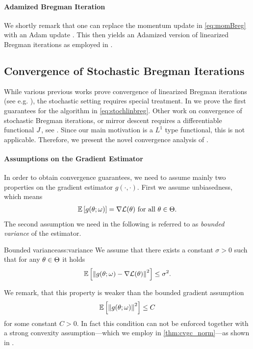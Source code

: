 \paragraph{Adamized Bregman Iteration} We shortly remark that one can replace the momentum update in \cref{eq:momBreg} with an Adam update \cite{kingma2014adam}. This then yields an Adamized version of linearized Bregman iterations as employed in \cite{bungert2022bregman}.


\subsection{Convergence of Stochastic Bregman Iterations}\label{sec:ConvAna}
%
%
While various previous works prove convergence of linearized Bregman iterations (see e.g. \cite{osher2005iterative, cai2009convergence}), the stochastic setting requires special treatment. In \cite{bungert2022bregman} we prove the first guarantees for the algorithm in \cref{eq:stochlinbreg}. Other work on convergence of stochastic Bregman iterations, or mirror descent requires a differentiable functional $J$, see \cite{dragomir2021fast, hanzely2021fastest, zhang2018convergence, d2021stochastic, aubin2022mirror}. Since our main motivation is a $L^1$ type functional, this is not applicable. Therefore, we present the novel convergence analysis of \cite{bungert2022bregman}.
%
%
\paragraph{Assumptions on the Gradient Estimator}
%
In order to obtain convergence guarantees, we need to assume mainly two properties on the gradient estimator $g(\cdot,\cdot)$. First we assume unbiasedness, which means
%
\begin{align*}
\mathbb{E}\left[g(\theta;\omega)\right] = \nabla\mathcal{L}(\theta)\text{ for all }\theta\in\Theta.
\end{align*}
%
The second assumption we need in the following is referred to as \emph{bounded variance} of the estimator.
%
\begin{assumption}{Bounded variance}{ass:variance}
We assume that there exists a constant $\sigma>0$ such that for any $\theta\in\Theta$ it holds
\begin{align}
    \mathbb{E}\left[\left\|g(\theta;\omega)-\nabla\mathcal{L}(\theta)\right\|^2\right] \leq \sigma^2.
\end{align}
\end{assumption}
%
%
\begin{remark}{}{}
We remark, that this property is weaker than the bounded gradient assumption
%
\begin{align*}
\mathbb{E}\left[\left\|g(\theta;\omega)\right\|^2\right] \leq C
\end{align*}
%
for some constant $C>0$. In fact this condition can not be enforced together with a strong convexity assumption---which we employ in \cref{thm:cvgc_norm}---as shown in \cite{pmlr-v80-nguyen18c}.
\end{remark}
